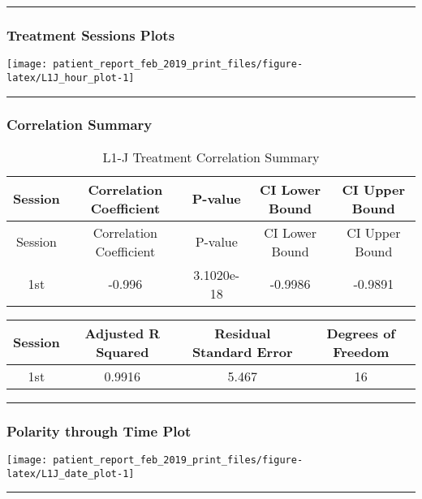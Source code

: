 \documentclass[]{article}
\begin{document}
\begin{center}\rule{0.5\linewidth}{\linethickness}\end{center}

\subsubsection{Treatment Sessions
Plots}\label{treatment-sessions-plots-6}

\texttt{[image: patient\_report\_feb\_2019\_print\_files/figure-latex/L1J\_hour\_plot-1]}

\begin{center}\rule{0.5\linewidth}{\linethickness}\end{center}

\subsubsection{Correlation Summary}\label{correlation-summary-6}

\begin{longtable}[]{@{}ccccc@{}}
\caption{L1-J Treatment Correlation Summary}\tabularnewline
\toprule
Session & Correlation Coefficient & P-value & CI Lower Bound & CI Upper
Bound\tabularnewline
\midrule
\endfirsthead
\toprule
Session & Correlation Coefficient & P-value & CI Lower Bound & CI Upper
Bound\tabularnewline
\midrule
\endhead
1st & -0.996 & 3.1020e-18 & -0.9986 & -0.9891\tabularnewline
\bottomrule
\end{longtable}

\begin{longtable}[]{@{}cccc@{}}
\toprule
Session & Adjusted R Squared & Residual Standard Error & Degrees of
Freedom\tabularnewline
\midrule
\endhead
1st & 0.9916 & 5.467 & 16\tabularnewline
\bottomrule
\end{longtable}

\begin{center}\rule{0.5\linewidth}{\linethickness}\end{center}

\subsubsection{Polarity through Time
Plot}\label{polarity-through-time-plot-6}

\texttt{[image: patient\_report\_feb\_2019\_print\_files/figure-latex/L1J\_date\_plot-1]}

\begin{center}\rule{0.5\linewidth}{\linethickness}\end{center}
\end{document}
